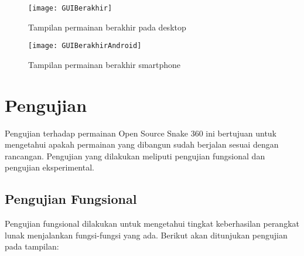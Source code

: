 \begin{figure}[H]
	\centering  
	\texttt{[image: GUIBerakhir]}  
	\caption[Tampilan permainan berakhir pada desktop]{Tampilan permainan berakhir pada desktop}
	\label{fig:GUIBerakhir} 
\end{figure}

\begin{figure}[H]
	\centering  
	\texttt{[image: GUIBerakhirAndroid]}  
	\caption[Tampilan permainan berakhir pada smartphone]{Tampilan permainan berakhir smartphone}
	\label{fig:GUIBerakhirAndroid} 
\end{figure}

\section{Pengujian}
Pengujian terhadap permainan Open Source Snake 360 ini bertujuan untuk mengetahui apakah permainan yang dibangun sudah berjalan sesuai dengan rancangan. Pengujian yang dilakukan meliputi pengujian fungsional dan pengujian eksperimental. 

\subsection{Pengujian Fungsional}
Pengujian fungsional dilakukan untuk mengetahui tingkat keberhasilan perangkat lunak menjalankan fungsi-fungsi yang ada. Berikut akan ditunjukan pengujian pada tampilan: 

